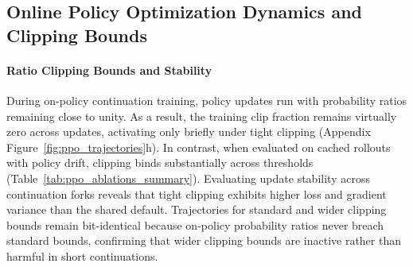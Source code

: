 \documentclass{article}
\begin{document}
\subsection{Online Policy Optimization Dynamics and Clipping Bounds}
\label{sec:results_ppo}

\paragraph{Ratio Clipping Bounds and Stability}
During on-policy continuation training, policy updates run with probability ratios remaining close to unity. As a result, the training clip fraction remains virtually zero across updates, activating only briefly under tight clipping (Appendix Figure~\ref{fig:ppo_trajectories}h). In contrast, when evaluated on cached rollouts with policy drift, clipping binds substantially across thresholds (Table~\ref{tab:ppo_ablations_summary}). Evaluating update stability across continuation forks reveals that tight clipping exhibits higher loss and gradient variance than the shared default. Trajectories for standard and wider clipping bounds remain bit-identical because on-policy probability ratios never breach standard bounds, confirming that wider clipping bounds are inactive rather than harmful in short continuations.
\end{document}
